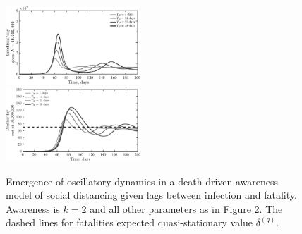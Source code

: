 \begin{figure}[t!]
\begin{center}
\includegraphics[width=0.45\textwidth]{scripts/figseir_Hdel_k2_noname.pdf}\\
\includegraphics[width=0.45\textwidth]{scripts/figseir_Hdel_k2D_noname.pdf}
\caption{Emergence of oscillatory dynamics in a death-driven awareness
model of social distancing given lags between infection and fatality.
Awareness is $k=2$ and all other parameters as in Figure 2.
The dashed
lines for fatalities expected quasi-stationary value $\delta^{(q)}$.
\label{fig.oscillate}}
\end{center}
\end{figure}



